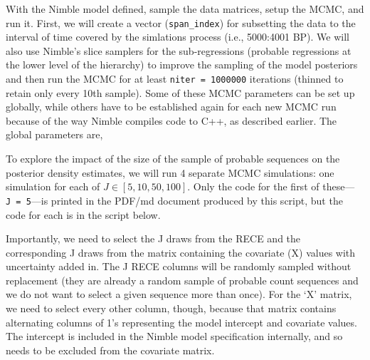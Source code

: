\documentclass[]{article}
\newenvironment{Shaded}{\begin{snugshade}}{\end{snugshade}}
\newcommand{\KeywordTok}[1]{\textcolor[rgb]{0.13,0.29,0.53}{\textbf{#1}}}
\newcommand{\DecValTok}[1]{\textcolor[rgb]{0.00,0.00,0.81}{#1}}
\newcommand{\StringTok}[1]{\textcolor[rgb]{0.31,0.60,0.02}{#1}}
\newcommand{\CommentTok}[1]{\textcolor[rgb]{0.56,0.35,0.01}{\textit{#1}}}
\newcommand{\OperatorTok}[1]{\textcolor[rgb]{0.81,0.36,0.00}{\textbf{#1}}}
\newcommand{\NormalTok}[1]{#1}
\begin{document}
With the Nimble model defined, sample the data matrices, setup the MCMC,
and run it. First, we will create a vector (\texttt{span\_index}) for
subsetting the data to the interval of time covered by the simlations
process (i.e., 5000:4001 BP). We will also use Nimble's slice samplers
for the sub-regressions (probable regressions at the lower level of the
hierarchy) to improve the sampling of the model posteriors and then run
the MCMC for at least \texttt{niter\ =\ 1000000} iterations (thinned to
retain only every 10th sample). Some of these MCMC parameters can be set
up globally, while others have to be established again for each new MCMC
run because of the way Nimble compiles code to C++, as described
earlier. The global parameters are,

\begin{Shaded}
\end{Shaded}

To explore the impact of the size of the sample of probable sequences on
the posterior density estimates, we will run 4 separate MCMC
simulations: one simulation for each of \(J \in [5, 10, 50, 100]\). Only
the code for the first of these---\texttt{J\ =\ 5}---is printed in the
PDF/md document produced by this script, but the code for each is in the
script below.

Importantly, we need to select the J draws from the RECE and the
corresponding J draws from the matrix containing the covariate (X)
values with uncertainty added in. The J RECE columns will be randomly
sampled without replacement (they are already a random sample of
probable count sequences and we do not want to select a given sequence
more than once). For the `X' matrix, we need to select every other
column, though, because that matrix contains alternating columns of 1's
representing the model intercept and covariate values. The intercept is
included in the Nimble model specification internally, and so needs to
be excluded from the covariate matrix.
\end{document}
